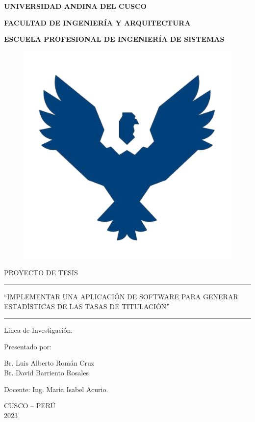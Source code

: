 \begin{titlepage}
	\begin{center}
		{\LARGE \textbf{UNIVERSIDAD ANDINA DEL CUSCO}}
		
		\vspace{0.5cm}
		{\large \textbf{FACULTAD DE INGENIERÍA Y ARQUITECTURA}}
		
		\vspace{0.5cm}		
		{\large \textbf{ESCUELA PROFESIONAL DE INGENIERÍA DE SISTEMAS}}
		\begin{figure}[h]
			\centering	
			\includegraphics[scale=0.40]{imagenes/logo.png}		
		\end{figure}
		
		{\large {PROYECTO DE TESIS}}
		
		\rule{163mm}{0.3mm}		
		
		
		\begin{spacing}{1}
			{\large ``IMPLEMENTAR UNA APLICACIÓN DE SOFTWARE PARA GENERAR ESTADÍSTICAS DE LAS TASAS DE TITULACIÓN''}
		\end{spacing} 
		
		
		\rule{163mm}{0.3mm}
		
		\vspace{0.5cm}
		
		{\large {Linea de Investigación: }}
		\vspace{0.5cm}
		
		{\large {Presentado por:}}		
		
		{\large {Br. Luis Alberto Román Cruz	}}\\
		{\large {Br. David Barriento Rosales	}}
		\vspace{0.5cm}
		
		{\large {Docente: Ing. Maria Isabel Acurio.}}
		\vspace{0.5cm}
		
		{\large {CUSCO – PERÚ }}\\
		{\large {2023 }}
		\vspace{0.5cm}
		
		
	\end{center}
\end{titlepage}